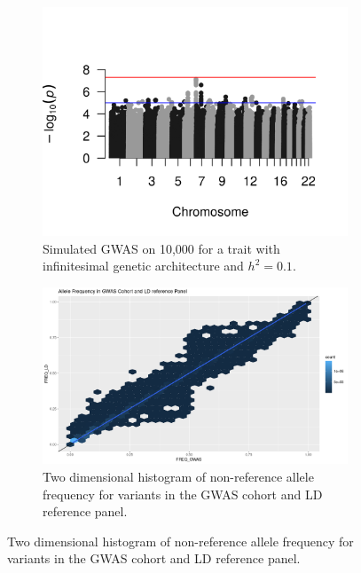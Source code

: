 \begin{figure}
  \centering
  \begin{subfigure}[t]{\textwidth}
    \centering
    \includegraphics[width=\linewidth]{img/rssp_01.png}
    \caption{Simulated GWAS on 10,000 for a trait with infinitesimal genetic architecture and $h^2=0.1$.  }\label{fig:gwas_01}
  \end{subfigure}
    \begin{subfigure}[t]{\textwidth}
    \centering
    \includegraphics[width=\linewidth]{img/Allele_freq_match.png}
    \caption{Two dimensional histogram of non-reference allele frequency for variants in the GWAS cohort and LD reference panel.}\label{fig:gwas_01}
  \end{subfigure}
  \end{figure}
